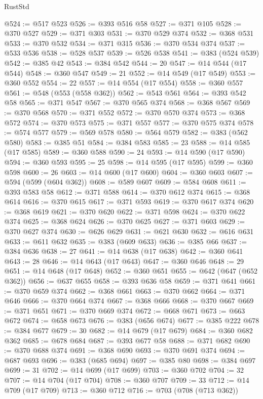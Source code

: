 \begin{lexlean}{RustStd}
\begin{coremodule}
{\begin{coremodule}
{{{{{{{{{{{{{{{{@524 := @517 @523
@526 := @393 @516 @58
@527 := @371 @105
@528 := @370 @527
@529 := @371 @303
@531 := @370 @529 @374
@532 := @368 @531
@533 := @370 @532
@534 := @371 @315
@536 := @370 @534 @374
@537 := @533 @536
@538 := @528 @537
@539 := @526 @538
@541 := @383 (@524 @539)
@542 := @385 @42
@543 := @384 @542
@544 := 20
@547 := @14 @544 (@17 @544)
@548 := @360 @547
@549 := 21
@552 := @14 @549 (@17 @549)
@553 := @360 @552
@554 := 22
@557 := @14 @554 (@17 @554)
@558 := @360 @557
@561 := @548 (@553 (@558 @362))
@562 := @543 @561
@564 := @393 @542 @58
@565 := @371 @547
@567 := @370 @565 @374
@568 := @368 @567
@569 := @370 @568
@570 := @371 @552
@572 := @370 @570 @374
@573 := @368 @572
@574 := @370 @573
@575 := @371 @557
@577 := @370 @575 @374
@578 := @574 @577
@579 := @569 @578
@580 := @564 @579
@582 := @383 (@562 @580)
@583 := @385 @51
@584 := @384 @583
@585 := 23
@588 := @14 @585 (@17 @585)
@589 := @360 @588
@590 := 24
@593 := @14 @590 (@17 @590)
@594 := @360 @593
@595 := 25
@598 := @14 @595 (@17 @595)
@599 := @360 @598
@600 := 26
@603 := @14 @600 (@17 @600)
@604 := @360 @603
@607 := @594 (@599 (@604 @362))
@608 := @589 @607
@609 := @584 @608
@611 := @393 @583 @58
@612 := @371 @588
@614 := @370 @612 @374
@615 := @368 @614
@616 := @370 @615
@617 := @371 @593
@619 := @370 @617 @374
@620 := @368 @619
@621 := @370 @620
@622 := @371 @598
@624 := @370 @622 @374
@625 := @368 @624
@626 := @370 @625
@627 := @371 @603
@629 := @370 @627 @374
@630 := @626 @629
@631 := @621 @630
@632 := @616 @631
@633 := @611 @632
@635 := @383 (@609 @633)
@636 := @385 @66
@637 := @384 @636
@638 := 27
@641 := @14 @638 (@17 @638)
@642 := @360 @641
@643 := 28
@646 := @14 @643 (@17 @643)
@647 := @360 @646
@648 := 29
@651 := @14 @648 (@17 @648)
@652 := @360 @651
@655 := @642 (@647 (@652 @362))
@656 := @637 @655
@658 := @393 @636 @58
@659 := @371 @641
@661 := @370 @659 @374
@662 := @368 @661
@663 := @370 @662
@664 := @371 @646
@666 := @370 @664 @374
@667 := @368 @666
@668 := @370 @667
@669 := @371 @651
@671 := @370 @669 @374
@672 := @668 @671
@673 := @663 @672
@674 := @658 @673
@676 := @383 (@656 @674)
@677 := @385 @222
@678 := @384 @677
@679 := 30
@682 := @14 @679 (@17 @679)
@684 := @360 @682 @362
@685 := @678 @684
@687 := @393 @677 @58
@688 := @371 @682
@690 := @370 @688 @374
@691 := @368 @690
@693 := @370 @691 @374
@694 := @687 @693
@696 := @383 (@685 @694)
@697 := @385 @80
@698 := @384 @697
@699 := 31
@702 := @14 @699 (@17 @699)
@703 := @360 @702
@704 := 32
@707 := @14 @704 (@17 @704)
@708 := @360 @707
@709 := 33
@712 := @14 @709 (@17 @709)
@713 := @360 @712
@716 := @703 (@708 (@713 @362))
}}}}}}}}}}}}}}}}
\end{coremodule}}
\end{coremodule}
\end{lexlean}
